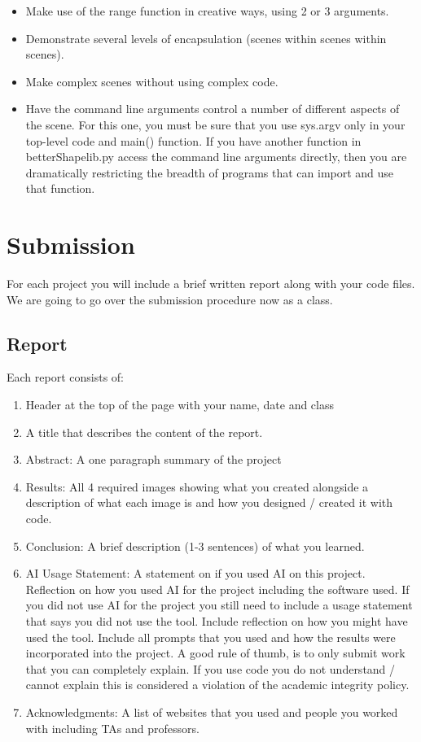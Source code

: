 \documentclass[12pt]{article}
\begin{document}
\begin{itemize}
\item Make use of the range function in creative ways, using 2 or 3 arguments.
\item Demonstrate several levels of encapsulation (scenes within scenes within scenes).
\item Make complex scenes without using complex code.
\item Have the command line arguments control a number of different aspects of the scene. For this one, you must be sure that you use sys.argv only in your top-level code and main() function. If you have another function in betterShapelib.py access the command line arguments directly, then you are dramatically restricting the breadth of programs that can import and use that function.
\end{itemize}

\section{Submission}
For each project you will include a brief written report along with your code files.
We are going to go over the submission procedure now as a class. 

\subsection{Report}
Each report consists of:
\begin{enumerate}
\item Header at the top of the page with your name, date and class
\item A title that describes the content of the report. 
\item Abstract: A one paragraph summary of the project
\item Results: All 4 required images showing what you created alongside a description of what each image is and how you designed / created it with code.
\item Conclusion: A brief description (1-3 sentences) of what you learned.
\item AI Usage Statement: A statement on if you used AI on this project. Reflection on how you used AI for the project including the software used. If you did not use AI for the project you still need to include a usage statement that says you did not use the tool. Include reflection on how you might have used the tool. Include all prompts that you used and how the results were incorporated into the project. A good rule of thumb, is to only submit work that you can completely explain. If you use code you do not understand / cannot explain this is considered a violation of the academic integrity policy.
\item Acknowledgments: A list of websites that you used and people you worked with including TAs and professors.
\end{enumerate}
\end{document}
